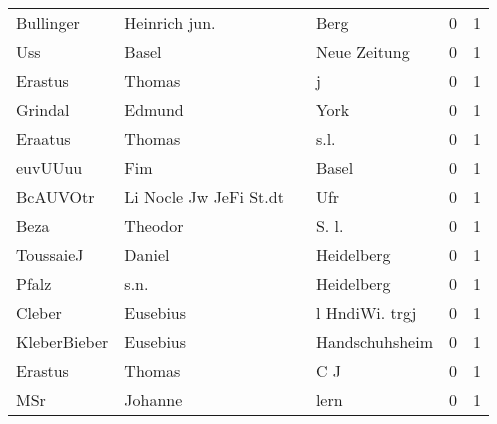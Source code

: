 \begin{center}
\begin{tiny}
\begin{longtabu}{llllrr}
                Bullinger &                      Heinrich jun. &             &                                        Berg &          0 &         1 \\
                      Uss &                              Basel &             &                                Neue Zeitung &          0 &         1 \\
                  Erastus &                             Thomas &             &                                           j &          0 &         1 \\
                  Grindal &                             Edmund &             &                                        York &          0 &         1 \\
                  Eraatus &                             Thomas &             &                                        s.l. &          0 &         1 \\
                  euvUUuu &                                Fim &             &                                       Basel &          0 &         1 \\
                 BcAUVOtr &             Li Nocle Jw JeFi St.dt &             &                                         Ufr &          0 &         1 \\
                     Beza &                            Theodor &             &                                      S. l.  &          0 &         1 \\
                ToussaieJ &                             Daniel &             &                                  Heidelberg &          0 &         1 \\
                    Pfalz &                               s.n. &             &                                  Heidelberg &          0 &         1 \\
                   Cleber &                           Eusebius &             &                              l HndiWi. trgj &          0 &         1 \\
             KleberBieber &                           Eusebius &             &                              Handschuhsheim &          0 &         1 \\
                  Erastus &                             Thomas &             &                                         C J &          0 &         1 \\
                      MSr &                            Johanne &             &                                        lern &          0 &         1 \\

\end{longtabu}
\end{tiny}
\end{center}
